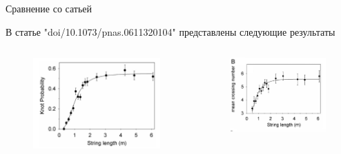 \begin{frame}{Сравнение со сатьей}

	\begin{block}{}
		В статье "doi/10.1073/pnas.0611320104" представлены следующие результаты
	\end{block}

	\begin{columns}

		\begin{column}{0.5\linewidth}
			\begin{figure}[H]
				\includegraphics[width=1\linewidth]{img/knot_prob.png}
			\end{figure}

		\end{column}

		\begin{column}{0.5\linewidth}
			\begin{figure}[H]
				\includegraphics[width=1\linewidth]{img/kros_mean.png}
			\end{figure}
		\end{column}

	\end{columns}

\end{frame}

